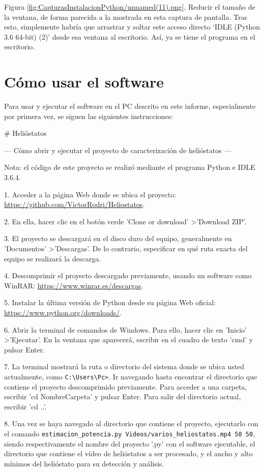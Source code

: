 Figura \ref{fig:CapturasInstalacionPython/unnamed(11).png}. Reducir el tamaño de la ventana, de forma parecida a la mostrada en esta captura de pantalla. Tras esto, simplemente habría que arrastrar y soltar este acceso directo ‘IDLE (Python 3.6 64-bit) (2)’ desde esa ventana al escritorio. Así, ya se tiene el programa en el escritorio.\\[20pt]

\section{Cómo usar el software}

Para usar y ejecutar el software en el PC descrito en este informe, especialmente por primera vez, se siguen las siguientes instrucciones:

\# Helióstatos

--- Cómo abrir y ejecutar el proyecto de caracterización de helióstatos ---

Nota: el código de este proyecto se realizó mediante el programa Python e IDLE 3.6.4.

1. Acceder a la página Web donde se ubica el proyecto: \url{https://github.com/VictorRodri/Heliostatos}.

2. En ella, hacer clic en el botón verde 'Clone or download' \textgreater 'Download ZIP'.

3. El proyecto se descargará en el disco duro del equipo, generalmente en 'Documentos' \textgreater 'Descargas'. De lo contrario, especificar en qué ruta exacta del equipo se realizará la descarga.

4. Descomprimir el proyecto descargado previamente, usando un software como WinRAR: \url{https://www.winrar.es/descargas}.

5. Instalar la última versión de Python desde su página Web oficial: \url{https://www.python.org/downloads/}.

6. Abrir la terminal de comandos de Windows. Para ello, hacer clic en 'Inicio' \textgreater 'Ejecutar'. En la ventana que aparecerá, escribir en el cuadro de texto 'cmd' y pulsar Enter.

7. La terminal mostrará la ruta o directorio del sistema donde se ubica usted actualmente, como \verb|C:\Users\Pc>|. Ir navegando hasta encontrar el directorio que contiene el proyecto descomprimido previamente. Para acceder a una carpeta, escribir 'cd NombreCarpeta' y pulsar Enter. Para salir del directorio actual, escribir 'cd ..'.

8. Una vez se haya navegado al directorio que contiene el proyecto, ejecutarlo con el comando \verb|estimacion_potencia.py Videos/varios_heliostatos.mp4 50 50|, siendo respectivamente el nombre del proyecto '.py' con el software ejecutable, el directorio que contiene el vídeo de helióstatos a ser procesado, y el ancho y alto mínimos del helióstato para su detección y análisis.

